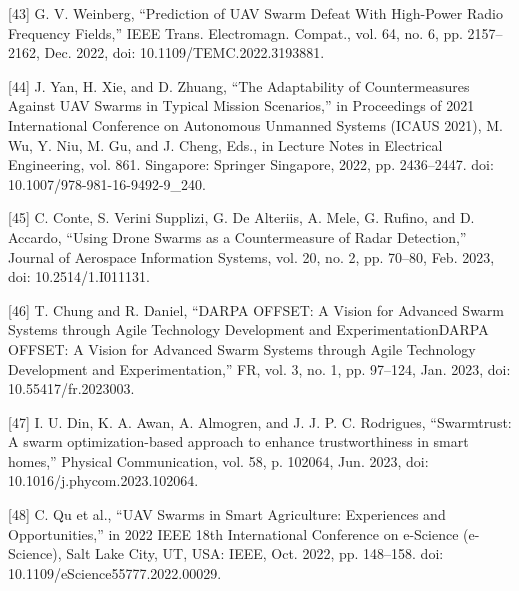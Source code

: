 [43] G. V. Weinberg, “Prediction of UAV Swarm Defeat With High-Power Radio Frequency Fields,” IEEE Trans. Electromagn. Compat., vol. 64, no. 6, pp. 2157–2162, Dec. 2022, doi: 10.1109/TEMC.2022.3193881.


[44] J. Yan, H. Xie, and D. Zhuang, “The Adaptability of Countermeasures Against UAV Swarms in Typical Mission Scenarios,” in Proceedings of 2021 International Conference on Autonomous Unmanned Systems (ICAUS 2021), M. Wu, Y. Niu, M. Gu, and J. Cheng, Eds., in Lecture Notes in Electrical Engineering, vol. 861. Singapore: Springer Singapore, 2022, pp. 2436–2447. doi: 10.1007/978-981-16-9492-9_240.


[45] C. Conte, S. Verini Supplizi, G. De Alteriis, A. Mele, G. Rufino, and D. Accardo, “Using Drone Swarms as a Countermeasure of Radar Detection,” Journal of Aerospace Information Systems, vol. 20, no. 2, pp. 70–80, Feb. 2023, doi: 10.2514/1.I011131.


[46] T. Chung and R. Daniel, “DARPA OFFSET: A Vision for Advanced Swarm Systems through Agile Technology Development and ExperimentationDARPA OFFSET: A Vision for Advanced Swarm Systems through Agile Technology Development and Experimentation,” FR, vol. 3, no. 1, pp. 97–124, Jan. 2023, doi: 10.55417/fr.2023003.


[47] I. U. Din, K. A. Awan, A. Almogren, and J. J. P. C. Rodrigues, “Swarmtrust: A swarm optimization-based approach to enhance trustworthiness in smart homes,” Physical Communication, vol. 58, p. 102064, Jun. 2023, doi: 10.1016/j.phycom.2023.102064.


[48] C. Qu et al., “UAV Swarms in Smart Agriculture: Experiences and Opportunities,” in 2022 IEEE 18th International Conference on e-Science (e-Science), Salt Lake City, UT, USA: IEEE, Oct. 2022, pp. 148–158. doi: 10.1109/eScience55777.2022.00029.